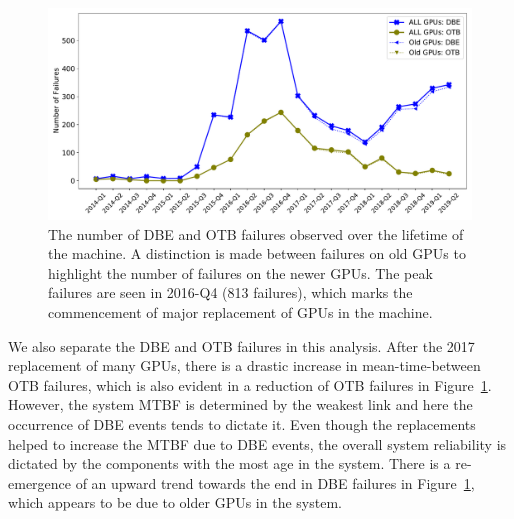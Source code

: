 \begin{figure}[bt]
  \begin{center}
    \includegraphics[width=\columnwidth]{figs/NumFailures_Quarterly_newOld.pdf}
  \end{center}
  \caption{The number of DBE and OTB failures observed over the lifetime of the machine.
A distinction is made between failures on old GPUs to highlight the number
of failures on the newer GPUs. The peak failures are seen in 2016-Q4 (813 failures), 
which marks the commencement of major replacement of GPUs in the machine.}
  \label{fig:NumFails_sys}
\end{figure}

We also separate the DBE and OTB failures in this analysis. After the
2017 replacement of many GPUs, there is a drastic increase in
mean-time-between OTB failures, which is also evident in a reduction of OTB failures in Figure~\ref{fig:NumFails_sys}.
However, the system MTBF is determined by the weakest link and here the occurrence of DBE events tends to dictate it.
Even though the replacements helped to increase the MTBF due to DBE events, the overall system 
reliability is dictated by the components with the most age in the
system. There is a re-emergence of an upward trend towards 
the end in DBE failures in Figure~\ref{fig:NumFails_sys}, which
appears to be due to older GPUs in the system. 

